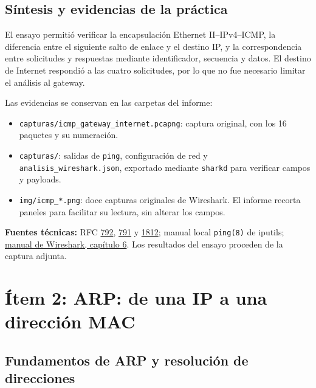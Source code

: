 \documentclass[12pt,a4paper]{article}
\let\oldsection\section
\renewcommand{\section}{\clearpage\oldsection}
\begin{document}
\subsection{Síntesis y evidencias de la práctica}

El ensayo permitió verificar la encapsulación Ethernet II--IPv4--ICMP,
la diferencia entre el siguiente salto de enlace y el destino IP, y la
correspondencia entre solicitudes y respuestas mediante identificador,
secuencia y datos. El destino de Internet respondió a las cuatro solicitudes,
por lo que no fue necesario limitar el análisis al gateway.

Las evidencias se conservan en las carpetas del informe:
\begin{itemize}
\setlength{\itemsep}{0pt}
\setlength{\parskip}{0pt}
\small
\item \texttt{capturas/icmp\_gateway\_internet.pcapng}: captura original, con
los 16 paquetes y su numeración.
\item \texttt{capturas/}: salidas de \texttt{ping}, configuración de red y
\texttt{analisis\_wireshark.json}, exportado mediante \texttt{sharkd} para
verificar campos y payloads.
\item \texttt{img/icmp\_*.png}: doce capturas originales de Wireshark.
El informe recorta paneles para facilitar su lectura, sin alterar los campos.
\end{itemize}

{\small\textbf{Fuentes técnicas:}
RFC \href{https://www.rfc-editor.org/rfc/rfc792}{792},
\href{https://www.rfc-editor.org/rfc/rfc791}{791} y
\href{https://www.rfc-editor.org/rfc/rfc1812}{1812}; manual local
\texttt{ping(8)} de iputils;
\href{https://www.wireshark.org/docs/wsug_html_chunked/ChapterWork.html}{manual
de Wireshark, capítulo 6}. Los resultados del ensayo proceden de la captura adjunta.\par}

\section{Ítem 2: ARP: de una IP a una dirección MAC}

\subsection{Fundamentos de ARP y resolución de direcciones}
\end{document}
